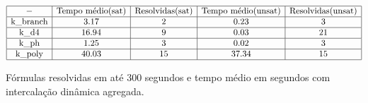 \begin{table*}[t]
	\[
\begin{array}{|c|c|c|c|c|}
	\hline - & \textnormal{Tempo médio(sat)} & \textnormal{Resolvidas(sat)} & \textnormal{Tempo médio(unsat)} & \textnormal{Resolvidas(unsat)} \\
	
	\hline \textnormal{k\_branch} & 3.17 & 2 & 0.23 & 3 \\
	\hline \textnormal{k\_d4} & 16.94 & 9 & 0.03 & 21 \\
	\hline \textnormal{k\_ph} & 1.25 & 3 & 0.02 & 3 \\
	\hline \textnormal{k\_poly} & 40.03 & 15 & 37.34 & 15 \\
	
	\hline
	
\end{array}
	\]
\caption{Fórmulas resolvidas em até 300 segundos e tempo médio em segundos com intercalação dinâmica agregada.}
\label{table:300big1}
\end{table*}


